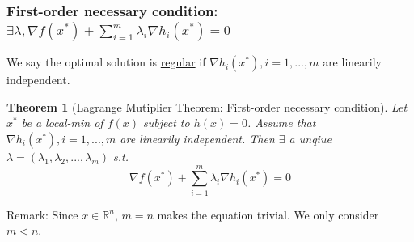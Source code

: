 \documentclass[11pt,a4paper]{article}
\newtheorem{theorem}{Theorem}
\begin{document}
\subsubsection{First-order necessary condition: $\exists\lambda, \nabla f(x^*)+\sum_{i=1}^m\lambda_i \nabla h_i(x^*)=0$}
We say the optimal solution is \underline{regular} if $\nabla h_i(x^*),i=1,...,m$ are linearily independent.
\begin{theorem}[Lagrange Mutiplier Theorem: First-order necessary condition]
    Let $x^*$ be a local-min of $f(x)$ subject to $h(x)=0$. Assume that $\nabla h_i(x^*),i=1,...,m$ are linearily independent. Then $\exists$ a unqiue $\lambda=(\lambda_1,\lambda_2,...,\lambda_m)$ s.t.
    \begin{equation}
        \nabla f(x^*)+\sum_{i=1}^m\lambda_i \nabla h_i(x^*)=0
    \end{equation}
\end{theorem}
Remark: Since $x\in \mathbb{R}^n$, $m=n$ makes the equation trivial. We only consider $m<n$.
\end{document}
